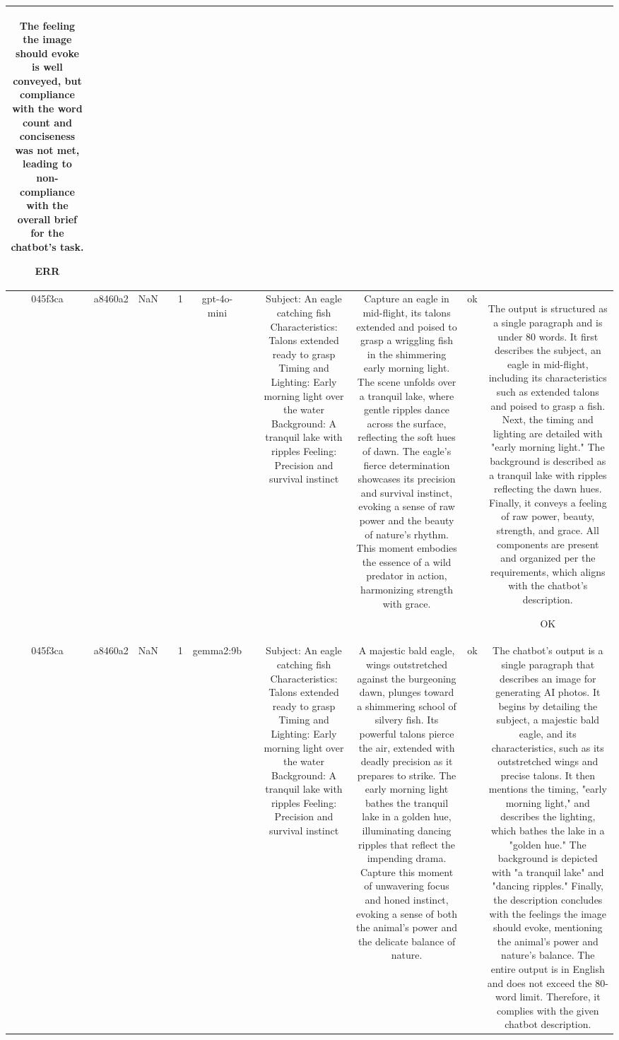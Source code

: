 \begin{table}[h!]
\begin{tabular}{|c|c|c|c|c|c|c|c|c|c|c|}
The feeling the image should evoke is well conveyed, but compliance with the word count and conciseness was not met, leading to non-compliance with the overall brief for the chatbot's task.

ERR\\
\hline
045f3ca & a8460a2 & NaN &  & 1 & gpt-4o-mini &  & Subject: An eagle catching fish  
Characteristics: Talons extended ready to grasp  
Timing and Lighting: Early morning light over the water  
Background: A tranquil lake with ripples  
Feeling: Precision and survival instinct & Capture an eagle in mid-flight, its talons extended and poised to grasp a wriggling fish in the shimmering early morning light. The scene unfolds over a tranquil lake, where gentle ripples dance across the surface, reflecting the soft hues of dawn. The eagle's fierce determination showcases its precision and survival instinct, evoking a sense of raw power and the beauty of nature’s rhythm. This moment embodies the essence of a wild predator in action, harmonizing strength with grace. & ok & The output is structured as a single paragraph and is under 80 words. It first describes the subject, an eagle in mid-flight, including its characteristics such as extended talons and poised to grasp a fish. Next, the timing and lighting are detailed with "early morning light." The background is described as a tranquil lake with ripples reflecting the dawn hues. Finally, it conveys a feeling of raw power, beauty, strength, and grace. All components are present and organized per the requirements, which aligns with the chatbot's description.

OK\\
\hline
045f3ca & a8460a2 & NaN &  & 1 & gemma2:9b &  & Subject: An eagle catching fish  
Characteristics: Talons extended ready to grasp  
Timing and Lighting: Early morning light over the water  
Background: A tranquil lake with ripples  
Feeling: Precision and survival instinct & A majestic bald eagle, wings outstretched against the burgeoning dawn, plunges toward a shimmering school of silvery fish. Its powerful talons pierce the air, extended with deadly precision as it prepares to strike. The early morning light bathes the tranquil lake in a golden hue, illuminating dancing ripples that reflect the impending drama. Capture this moment of unwavering focus and honed instinct, evoking a sense of both  the animal's power and the delicate balance of nature.  


 & ok & The chatbot's output is a single paragraph that describes an image for generating AI photos. It begins by detailing the subject, a majestic bald eagle, and its characteristics, such as its outstretched wings and precise talons. It then mentions the timing, "early morning light," and describes the lighting, which bathes the lake in a "golden hue." The background is depicted with "a tranquil lake" and "dancing ripples." Finally, the description concludes with the feelings the image should evoke, mentioning the animal's power and nature's balance. The entire output is in English and does not exceed the 80-word limit. Therefore, it complies with the given chatbot description.


\end{tabular}
\end{table}
